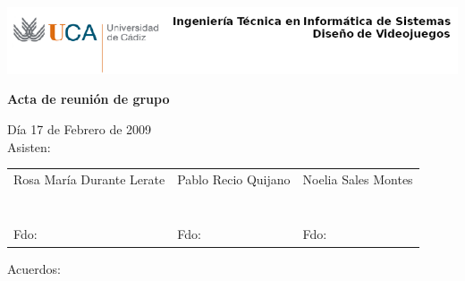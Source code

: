 \documentclass[a4paper,10pt]{article}
\begin{document}
\includegraphics[scale=0.6]{../uca.png}

\begin{center}
  \noindent \huge\textbf{ Acta de reunión de grupo}\\
\end{center}

\noindent Día 17 de Febrero de 2009\\

\noindent Asisten:

\begin{center}
\begin{tabular}{|m{5.2cm}|m{5.2cm}|m{5.2cm}|}
  \hline
  Rosa María Durante Lerate & Pablo Recio Quijano & Noelia Sales Montes\\
  & & \\
  & & \\
  & & \\
  & & \\
  & & \\
  & & \\
  & & \\
  Fdo: & Fdo: & Fdo: \\
  \hline
\end{tabular}
\end{center}

\noindent Acuerdos:\\
\end{document}

